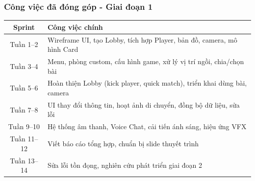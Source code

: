 \begin{frame}
\frametitle{Công việc đã đóng góp - Giai đoạn 1}
\begin{table}[H]
\centering
\renewcommand{\arraystretch}{1.2}
\small
\begin{tabular}{|c|l|}
\hline
\textbf{Sprint} & \textbf{Công việc chính} \\ \hline

Tuần 1--2 & Wireframe UI, tạo Lobby, tích hợp Player, bản đồ, camera, mô hình Card \\ \hline

Tuần 3--4 & Menu, phòng custom, cấu hình game, xử lý vị trí ngồi, chia/chọn bài \\ \hline

Tuần 5--6 & Hoàn thiện Lobby (kick player, quick match), triển khai dùng bài, camera \\ \hline

Tuần 7--8 & UI thay đổi thông tin, hoạt ảnh di chuyển, đồng bộ dữ liệu, sửa lỗi \\ \hline

Tuần 9--10 & Hệ thống âm thanh, Voice Chat, cải tiến ánh sáng, hiệu ứng VFX \\ \hline

Tuần 11--12 & Viết báo cáo tổng hợp, chuẩn bị slide thuyết trình \\ \hline

Tuần 13--14 & Sửa lỗi tồn đọng, nghiên cứu phát triển giai đoạn 2 \\ \hline

\end{tabular}
\end{table}
\end{frame}

